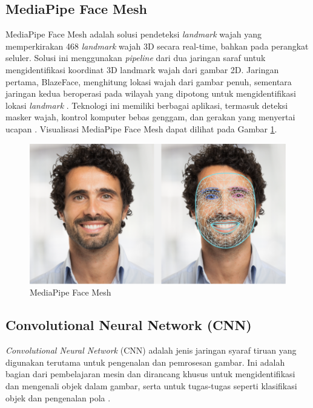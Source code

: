 \subsection{MediaPipe Face Mesh}

MediaPipe Face Mesh adalah solusi pendeteksi \textit{landmark} wajah yang memperkirakan 468 \textit{landmark} wajah 3D secara real-time, bahkan pada perangkat seluler. Solusi ini menggunakan \textit{pipeline} dari dua jaringan saraf untuk mengidentifikasi koordinat 3D landmark wajah dari gambar 2D. Jaringan pertama, BlazeFace, menghitung lokasi wajah dari gambar penuh, sementara jaringan kedua beroperasi pada wilayah yang dipotong untuk mengidentifikasi lokasi \textit{landmark} \cite{mediapipe_2020}. Teknologi ini memiliki berbagai aplikasi, termasuk deteksi masker wajah, kontrol komputer bebas genggam, dan gerakan yang menyertai ucapan \cite{thaman_2022}. Visualisasi MediaPipe Face Mesh dapat dilihat pada Gambar \ref{fig:facemesh}.

\begin{figure} [ht] \centering
    \includegraphics[scale=0.3]{gambar/face_landmark.png}
    \caption{MediaPipe Face Mesh}
    \label{fig:facemesh}
\end{figure}

\subsection{Convolutional Neural Network (CNN)}

\emph{Convolutional Neural Network} (CNN) adalah jenis jaringan syaraf tiruan yang digunakan terutama untuk pengenalan dan pemrosesan gambar. Ini adalah bagian dari pembelajaran mesin dan dirancang khusus untuk mengidentifikasi dan mengenali objek dalam gambar, serta untuk tugas-tugas seperti klasifikasi objek dan pengenalan pola \cite{arm_2023}. 

